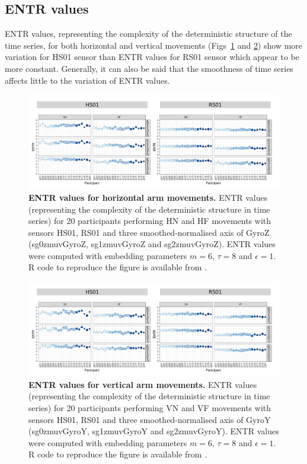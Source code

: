 \subsection{ENTR values}
ENTR values, representing the complexity of the deterministic structure 
of the time series, for both horizontal and vertical movements 
(Figs~\ref{fig:entr_aH} and \ref{fig:entr_aV}) show more variation 
for HS01 sensor than ENTR values for RS01 sensor which appear 
to be more constant. 
Generally, it can also be said that the smoothness of time series affects 
little to the variation of ENTR values.
\begin{figure}[!h]
\centering
\includegraphics[width=1.0\textwidth]{entr_aH}
    \caption{
	{\bf ENTR values for horizontal arm movements.}
    	ENTR values (representing the complexity of the deterministic 
	structure in time series) for 
	20 participants performing HN and HF movements
	with sensors HS01, RS01 and three smoothed-normalised axis 
	of GyroZ (sg0zmuvGyroZ, sg1zmuvGyroZ and sg2zmuvGyroZ).
	ENTR values were computed with 
	embedding parameters $m=6$, $\tau=8$ and $\epsilon=1$.
	R code to reproduce the figure is available from \cite{hwum2018}.
        }
    \label{fig:entr_aH}
\end{figure}
\begin{figure}[!h]
\centering
\includegraphics[width=1.0\textwidth]{entr_aV}
    \caption{
	{\bf ENTR values for vertical arm movements.}
    	ENTR values (representing the complexity of the deterministic 
	structure in time series) for 
	20 participants performing VN and VF movements
	with sensors HS01, RS01 and three smoothed-normalised axis 
	of GyroY (sg0zmuvGyroY, sg1zmuvGyroY and sg2zmuvGyroY).
	ENTR values were computed with 
	embedding parameters $m=6$, $\tau=8$ and $\epsilon=1$.
	R code to reproduce the figure is available from \cite{hwum2018}.
        }
    \label{fig:entr_aV}
\end{figure}



